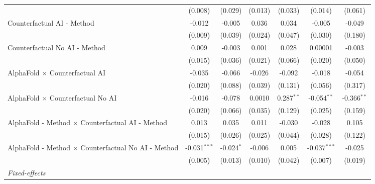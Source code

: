 \begin{tabular}{lcccccc}
                                                              & (0.008)        & (0.029)       & (0.013)       & (0.033)      & (0.014)        & (0.061)\\   
   Counterfactual AI - Method                                 & -0.012         & -0.005        & 0.036         & 0.034        & -0.005         & -0.049\\   
                                                              & (0.009)        & (0.039)       & (0.024)       & (0.047)      & (0.030)        & (0.180)\\   
   Counterfactual No AI - Method                              & 0.009          & -0.003        & 0.001         & 0.028        & 0.00001        & -0.003\\   
                                                              & (0.015)        & (0.036)       & (0.021)       & (0.066)      & (0.020)        & (0.050)\\   
   AlphaFold $\times$ Counterfactual AI                       & -0.035         & -0.066        & -0.026        & -0.092       & -0.018         & -0.054\\   
                                                              & (0.020)        & (0.088)       & (0.039)       & (0.131)      & (0.056)        & (0.317)\\   
   AlphaFold $\times$ Counterfactual No AI                    & -0.016         & -0.078        & 0.0010        & 0.287$^{**}$ & -0.054$^{**}$  & -0.366$^{**}$\\   
                                                              & (0.020)        & (0.066)       & (0.035)       & (0.129)      & (0.025)        & (0.159)\\   
   AlphaFold - Method $\times$ Counterfactual AI - Method     & 0.013          & 0.035         & 0.011         & -0.030       & -0.028         & 0.105\\   
                                                              & (0.015)        & (0.026)       & (0.025)       & (0.044)      & (0.028)        & (0.122)\\   
   AlphaFold - Method $\times$ Counterfactual No AI - Method  & -0.031$^{***}$ & -0.024$^{*}$  & -0.006        & 0.005        & -0.037$^{***}$ & -0.025\\   
                                                              & (0.005)        & (0.013)       & (0.010)       & (0.042)      & (0.007)        & (0.019)\\   
   \midrule
   \emph{Fixed-effects}\\

\end{tabular}
